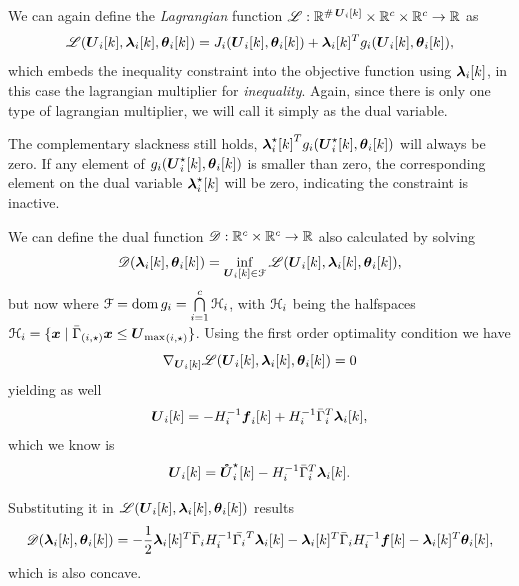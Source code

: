 \documentclass[../main.tex]{subfiles}
\begin{document}
We can again define the \emph{Lagrangian} function $\lagrangianname : \R^{\card\vec{U}_{i}[k]}\times \R^{c} \times \R^{c} \to \R$ as
\begin{equation}
  \label{eq:lagrangian_equality}
  \lagrangian=\obji(\vec{U}_{i}[k],\thetaik)+\lambdaik^T\inequalityfunction,
\end{equation}
which embeds the inequality constraint into the objective function using $\lambdaik$, in this case the lagrangian multiplier for \emph{inequality}.
Again, since there is only one type of lagrangian multiplier, we will call it simply as the dual variable.

\begin{remark}
  The complementary slackness still holds, ${\lambdaikstar}^T\inequalityfunctionname(\vec{U}_{i}^{\star}[k],\thetaik)$ will always be zero.
  If any element of $\inequalityfunctionname(\vec{U}_{i}^{\star}[k],\thetaik)$ is smaller than zero, the corresponding element on the dual variable $\lambdaikstar$ will be zero, indicating the constraint is inactive.
\end{remark}

We can define the dual function $\dualfunctionname:\R^{c} \times \R^{c} \to \R$ also calculated by solving
\begin{equation}
  \label{eq:dual_function_equality}
  \dualfunction=\inf_{\vec{U}_{i}[k]\in\set{F}} \lagrangian,
\end{equation}
but now where $\set{F}=\dom \inequalityfunctionname=\bigcap\limits_{i=1}^{c}\set{H}_{i}$, with $\set{H}_{i}$ being the halfspaces
${\set{H}_i=\setbuild{\vec{x}}{\elem[i,\star]{{\bar{\Gamma}}}\vec{x}\leq\elem[i,\star]{\vec{U}_{\max}}}}$.
Using the first order \KKT{} optimality condition we have
\begin{equation}
  \nabla_{\vec{U}_{i}[k]}\lagrangian=0
\end{equation}
yielding as well
\begin{equation}
  \vec{U}_{i}[k]=-H_{i}^{-1}\vec{f}_{i}[k]+H_{i}^{-1}\bar{\Gamma}_{i}^{T}\lambdaik,
\end{equation}
which we know is
\begin{equation}
  \vec{U}_{i}[k]=\optuncUik-H_{i}^{-1}\bar{\Gamma}_{i}^{T}\lambdaik.
\end{equation}

Substituting it in $\lagrangian$ results
\begin{equation}
  \label{eq:dual_function_solution_lambda_theta_ineq}
  \dualfunction=-\frac{1}{2}\lambdaik^{T}\linearcoefi\lambdaik-\lambdaik^{T}\bar{\Gamma}_{i}H_{i}^{-1}\vec{f}[k]-\lambdaik^{T}\thetaik,
\end{equation}
which is also concave.
\end{document}
